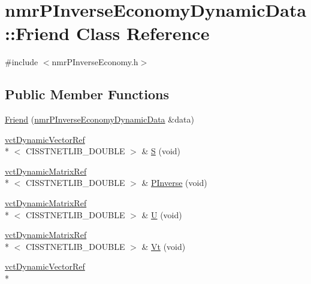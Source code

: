 \hypertarget{classnmr_p_inverse_economy_dynamic_data_1_1_friend}{\section{nmr\-P\-Inverse\-Economy\-Dynamic\-Data\-:\-:Friend Class Reference}
\label{classnmr_p_inverse_economy_dynamic_data_1_1_friend}
}


{\ttfamily \#include $<$nmr\-P\-Inverse\-Economy.\-h$>$}

\subsection*{Public Member Functions}
\begin{DoxyCompactItemize}
\item 
\hyperlink{classnmr_p_inverse_economy_dynamic_data_1_1_friend_a71b324bc90fb8a5ec690e635e811d51a}{Friend} (\hyperlink{classnmr_p_inverse_economy_dynamic_data}{nmr\-P\-Inverse\-Economy\-Dynamic\-Data} \&data)
\item 
\hyperlink{classvct_dynamic_vector_ref}{vct\-Dynamic\-Vector\-Ref}\\*
$<$ C\-I\-S\-S\-T\-N\-E\-T\-L\-I\-B\-\_\-\-D\-O\-U\-B\-L\-E $>$ \& \hyperlink{classnmr_p_inverse_economy_dynamic_data_1_1_friend_a537ca993dbfd73507c1776ebdb3f7054}{S} (void)
\item 
\hyperlink{classvct_dynamic_matrix_ref}{vct\-Dynamic\-Matrix\-Ref}\\*
$<$ C\-I\-S\-S\-T\-N\-E\-T\-L\-I\-B\-\_\-\-D\-O\-U\-B\-L\-E $>$ \& \hyperlink{classnmr_p_inverse_economy_dynamic_data_1_1_friend_aa52a780bd3b890fcf5ca7c71569d07aa}{P\-Inverse} (void)
\item 
\hyperlink{classvct_dynamic_matrix_ref}{vct\-Dynamic\-Matrix\-Ref}\\*
$<$ C\-I\-S\-S\-T\-N\-E\-T\-L\-I\-B\-\_\-\-D\-O\-U\-B\-L\-E $>$ \& \hyperlink{classnmr_p_inverse_economy_dynamic_data_1_1_friend_aa8af25256ee8c38f2056b03aaefebb31}{U} (void)
\item 
\hyperlink{classvct_dynamic_matrix_ref}{vct\-Dynamic\-Matrix\-Ref}\\*
$<$ C\-I\-S\-S\-T\-N\-E\-T\-L\-I\-B\-\_\-\-D\-O\-U\-B\-L\-E $>$ \& \hyperlink{classnmr_p_inverse_economy_dynamic_data_1_1_friend_a5300b5ad810345ed11cefa0d4a7bf9d3}{Vt} (void)
\item 
\hyperlink{classvct_dynamic_vector_ref}{vct\-Dynamic\-Vector\-Ref}\\*

\end{DoxyCompactItemize}

